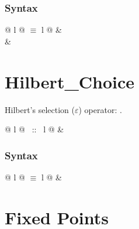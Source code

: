 \begin{isabellebody}
\begin{isamarkuptext}
\subsubsection*{Syntax}

\begin{tabular}{@ {} l @ {\quad$\equiv$\quad} l @ {}}
 & \\
 & \\
\end{tabular}


\section{Hilbert\_Choice}

Hilbert's selection ($\varepsilon$) operator: .
\smallskip

\begin{tabular}{@ {} l @ {~::~} l @ {}}
 & 
\end{tabular}

\subsubsection*{Syntax}

\begin{tabular}{@ {} l @ {\quad$\equiv$\quad} l @ {}}
 & 
\end{tabular}

\section{Fixed Points}


\end{isamarkuptext}
\end{isabellebody}
